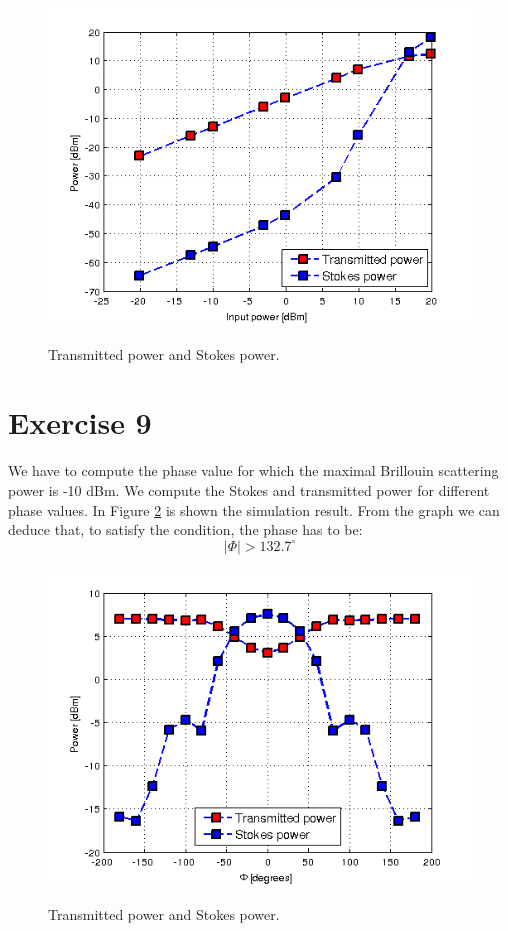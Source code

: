 \documentclass[a4paper,10pt]{report}
\begin{document}
\begin{figure}[!ht]
  \centering
  \includegraphics[width=12cm]{es8.png}\\
  \caption{Transmitted power and Stokes power.}
  \label{es8}
\end{figure}


\newpage
\section*{Exercise 9}
We have to compute the phase value for which the maximal Brillouin scattering power is -10 dBm.
We compute the Stokes and transmitted power for different phase values.
In Figure \ref{es9} is shown the simulation result. From the graph we can deduce that, to satisfy the condition, the phase has to be:
$$|\Phi|>132.7^{\circ}$$

\begin{figure}[!ht]
  \centering
  \includegraphics[width=12cm]{es9.png}\\
  \caption{Transmitted power and Stokes power.}
  \label{es9}
\end{figure}
\end{document}
